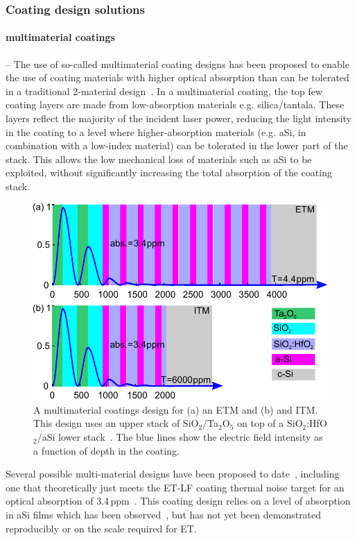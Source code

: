 \subsubsection{Coating design solutions}

\paragraph{multimaterial coatings} -- The use of so-called multimaterial coating designs has been proposed to enable the use of coating materials with higher optical absorption than can be tolerated in a traditional 2-material design~\cite{Yam2015,multimaterial2015}. In a multimaterial coating, the top few coating layers are made from low-absorption materials e.g. silica/tantala. These layers reflect the majority of the incident laser power, reducing the light intensity in the coating to a level where higher-absorption materials (e.g. aSi, in combination with a low-index material) can be tolerated in the lower part of the stack. This allows the low mechanical loss of materials such as aSi to be exploited, without significantly increasing the total absorption of the coating stack.

\begin{figure}
	\includegraphics[width=12cm]{Detector/Optics/CoreOptics/Images/EFI_ETM_ITM_2.pdf}
	\caption{A multimaterial coatings design for (a) an ETM and (b) and ITM. This design uses an upper stack of SiO$_2$/Ta$_2$O$_5$ on top of a SiO$_2$:HfO$_2$/aSi lower stack~\cite{Craig_2019}. The blue lines show the electric field intensity as a function of depth in the coating.}
\label{fig:coatings:mulitmat}
\end{figure}

Several possible multi-material designs have been proposed to date~\cite{Steinlecher_2017,ion_plating,Pan_2018,Birney_2018,Craig_2019}, including one that theoretically just meets the ET-LF coating thermal noise target for an optical absorption of 3.4\,ppm~\cite{Craig_2019}. This coating design relies on a level of absorption in aSi films which has been observed~\cite{Birney_2018}, but has not yet been demonstrated reproducibly or on the scale required for ET.

